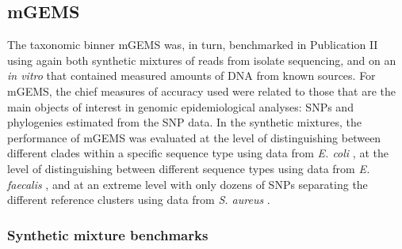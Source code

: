 \documentclass[officiallayout]{tktla}
\begin{document}
\subsection{mGEMS}
\label{mgems-performance-benchmark}

The taxonomic binner mGEMS was, in turn, benchmarked in Publication II
using again both synthetic mixtures of reads from isolate sequencing,
and on an \textit{in vitro} that contained measured amounts of DNA
from known sources. For mGEMS, the chief measures of accuracy used
were related to those that are the main objects of interest in genomic
epidemiological analyses: SNPs and phylogenies estimated from the SNP
data. In the synthetic mixtures, the performance of mGEMS was
evaluated at the level of distinguishing between different clades within a specific sequence type using data from
\textit{E. coli} \citep{brodrick2017longitudinal}, at the level of distinguishing between different sequence types using data from \textit{E. faecalis}
\citep{raven2016genome}, and at an extreme level with only dozens of
SNPs separating the different reference clusters using data from
\textit{S. aureus} \citep{paterson2015capturing}.

\subsubsection{Synthetic mixture benchmarks}
\end{document}
